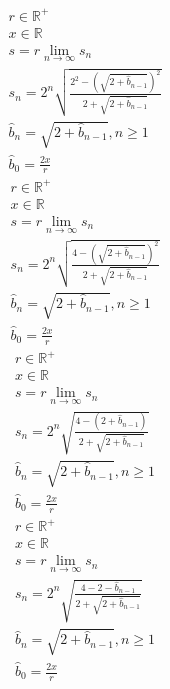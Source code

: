 \documentclass[a4paper,12pt]{report}
\begin{document}
\begin{subequations}
\begin{gather}
r \in \mathbb{R}^+ \\
x \in \mathbb{R} \\
s = r \lim \limits_{n \to \infty} s_n \\
s_n = 2^n \sqrt{\frac{2^2 - \left(\sqrt{2 + \hat{b}_{n-1}}\right)^2}{2 + \sqrt{2 + \hat{b}_{n-1}}}} \\
\hat{b}_n = \sqrt{2 + \hat{b}_{n-1}}, n \geq 1 \\
\hat{b}_0 = \frac{2x}{r}
\end{gather}
\end{subequations}
\begin{subequations}
\begin{gather}
r \in \mathbb{R}^+ \\
x \in \mathbb{R} \\
s = r \lim \limits_{n \to \infty} s_n \\
s_n = 2^n \sqrt{\frac{4 - \left(\sqrt{2 + \hat{b}_{n-1}}\right)^2}{2 + \sqrt{2 + \hat{b}_{n-1}}}} \\
\hat{b}_n = \sqrt{2 + \hat{b}_{n-1}}, n \geq 1 \\
\hat{b}_0 = \frac{2x}{r}
\end{gather}
\end{subequations}
\begin{subequations}
\begin{gather}
r \in \mathbb{R}^+ \\
x \in \mathbb{R} \\
s = r \lim \limits_{n \to \infty} s_n \\
s_n = 2^n \sqrt{\frac{4 - \left(2 + \hat{b}_{n-1}\right)}{2 + \sqrt{2 + \hat{b}_{n-1}}}} \\
\hat{b}_n = \sqrt{2 + \hat{b}_{n-1}}, n \geq 1 \\
\hat{b}_0 = \frac{2x}{r}
\end{gather}
\end{subequations}
\begin{subequations}
\begin{gather}
r \in \mathbb{R}^+ \\
x \in \mathbb{R} \\
s = r \lim \limits_{n \to \infty} s_n \\
s_n = 2^n \sqrt{\frac{4 - 2 - \hat{b}_{n-1}}{2 + \sqrt{2 + \hat{b}_{n-1}}}} \\
\hat{b}_n = \sqrt{2 + \hat{b}_{n-1}}, n \geq 1 \\
\hat{b}_0 = \frac{2x}{r}
\end{gather}
\end{subequations}
\end{document}
